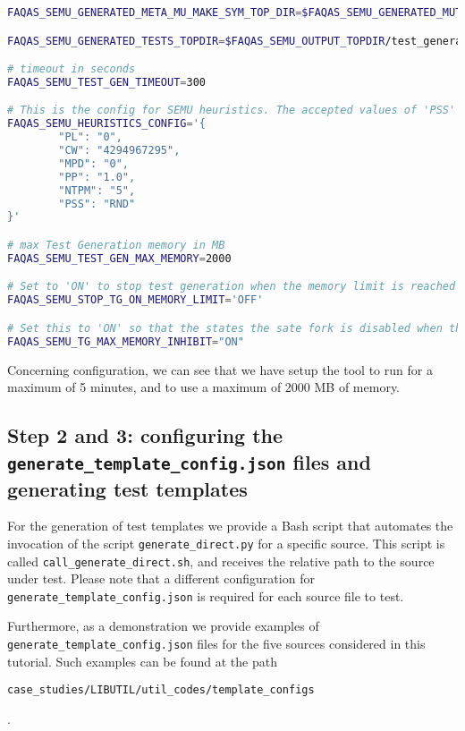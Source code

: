 \begin{lstlisting}[language=bash,label=listing:LIBUTIL:conf,caption=faqas\_semus\_conf.sh file for LIBUTIL case study.]
FAQAS_SEMU_GENERATED_META_MU_MAKE_SYM_TOP_DIR=$FAQAS_SEMU_GENERATED_MUTANTS_TOPDIR/"MakeSym-TestGen-Input"

FAQAS_SEMU_GENERATED_TESTS_TOPDIR=$FAQAS_SEMU_OUTPUT_TOPDIR/test_generation

# timeout in seconds
FAQAS_SEMU_TEST_GEN_TIMEOUT=300

# This is the config for SEMU heuristics. The accepted values of 'PSS' are 'RND' for random and 'MDO' for minimum distance to output
FAQAS_SEMU_HEURISTICS_CONFIG='{
        "PL": "0",
        "CW": "4294967295",
        "MPD": "0",
        "PP": "1.0",
        "NTPM": "5",
        "PSS": "RND"
}'

# max Test Generation memory in MB
FAQAS_SEMU_TEST_GEN_MAX_MEMORY=2000

# Set to 'ON' to stop test generation when the memory limit is reached
FAQAS_SEMU_STOP_TG_ON_MEMORY_LIMIT='OFF'

# Set this to 'ON' so that the states the sate fork is disabled when the memory limit is reached, to avoid going much over it
FAQAS_SEMU_TG_MAX_MEMORY_INHIBIT="ON"
\end{lstlisting}

Concerning \SEMU configuration, we can see that we have setup the tool to run for a maximum of 5 minutes, and to use a maximum of 2000 MB of memory.

\subsection{Step 2 and 3: configuring the \texttt{generate\_template\_config.json} files and generating test templates}

For the generation of test templates we provide a Bash script that automates the invocation of the script \texttt{generate\_direct.py} for a specific source. This script is called \texttt{call\_generate\_direct.sh}, and receives the relative path to the source under test. 
Please note that a different configuration for \texttt{generate\_template\_config.json} is required for each source file to test.


Furthermore, as a demonstration we provide examples of \texttt{generate\_template\_config.json} files for the five sources considered in this tutorial. Such examples can be found at the path \begin{small}\texttt{case\_studies/LIBUTIL/util\_codes/template\_configs}\end{small}.


